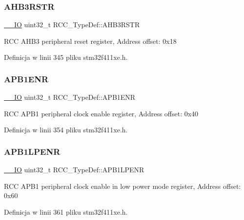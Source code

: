 \subsubsection{\texorpdfstring{A\+H\+B3\+R\+S\+TR}{AHB3RSTR}}
{\footnotesize\ttfamily \hyperlink{core__sc300_8h_aec43007d9998a0a0e01faede4133d6be}{\+\_\+\+\_\+\+IO} uint32\+\_\+t R\+C\+C\+\_\+\+Type\+Def\+::\+A\+H\+B3\+R\+S\+TR}

R\+CC A\+H\+B3 peripheral reset register, Address offset\+: 0x18 

Definicja w linii 345 pliku stm32f411xe.\+h.

\mbox{\label{struct_r_c_c___type_def_aec7622ba90341c9faf843d9ee54a759f}} 
\subsubsection{\texorpdfstring{A\+P\+B1\+E\+NR}{APB1ENR}}
{\footnotesize\ttfamily \hyperlink{core__sc300_8h_aec43007d9998a0a0e01faede4133d6be}{\+\_\+\+\_\+\+IO} uint32\+\_\+t R\+C\+C\+\_\+\+Type\+Def\+::\+A\+P\+B1\+E\+NR}

R\+CC A\+P\+B1 peripheral clock enable register, Address offset\+: 0x40 

Definicja w linii 354 pliku stm32f411xe.\+h.

\mbox{\label{struct_r_c_c___type_def_a5c8e710c40b642dcbf296201a7ecb2da}} 
\subsubsection{\texorpdfstring{A\+P\+B1\+L\+P\+E\+NR}{APB1LPENR}}
{\footnotesize\ttfamily \hyperlink{core__sc300_8h_aec43007d9998a0a0e01faede4133d6be}{\+\_\+\+\_\+\+IO} uint32\+\_\+t R\+C\+C\+\_\+\+Type\+Def\+::\+A\+P\+B1\+L\+P\+E\+NR}

R\+CC A\+P\+B1 peripheral clock enable in low power mode register, Address offset\+: 0x60 

Definicja w linii 361 pliku stm32f411xe.\+h.

\mbox{\label{struct_r_c_c___type_def_a600f4d6d592f43edb2fc653c5cba023a}} 
